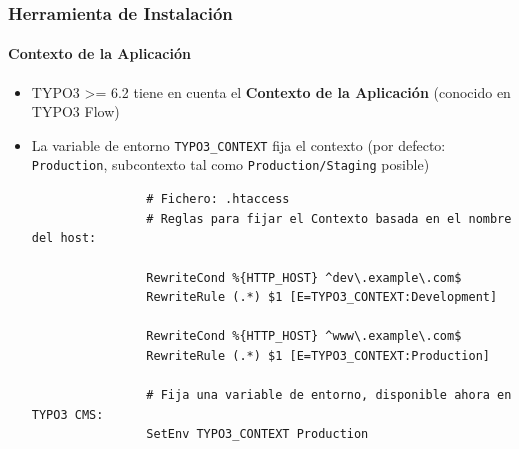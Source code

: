 
\begin{frame}[fragile]
	\frametitle{Herramienta de Instalación}
	\framesubtitle{Contexto de la Aplicación}

	\begin{itemize}
		\item TYPO3 >= 6.2 tiene en cuenta el \textbf{Contexto de la Aplicación}\newline
			\smaller(conocido en TYPO3 Flow)\normalsize
		\item La variable de entorno \texttt{TYPO3\_CONTEXT} fija el contexto\newline
			\smaller(por defecto: \texttt{Production}, subcontexto tal como \texttt{Production/Staging} posible)\normalsize

			\begin{lstlisting}
				# Fichero: .htaccess
				# Reglas para fijar el Contexto basada en el nombre del host:

				RewriteCond %{HTTP_HOST} ^dev\.example\.com$
				RewriteRule (.*) $1 [E=TYPO3_CONTEXT:Development]

				RewriteCond %{HTTP_HOST} ^www\.example\.com$
				RewriteRule (.*) $1 [E=TYPO3_CONTEXT:Production]

				# Fija una variable de entorno, disponible ahora en TYPO3 CMS:
				SetEnv TYPO3_CONTEXT Production
			\end{lstlisting}

	\end{itemize}

\end{frame}


